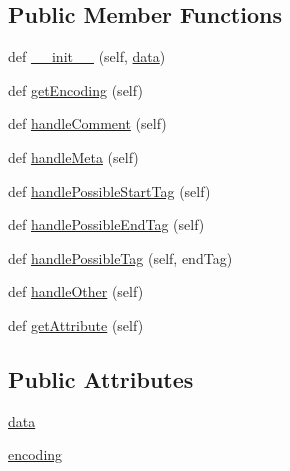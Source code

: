 \subsection*{Public Member Functions}
\begin{DoxyCompactItemize}
\item 
def \hyperlink{classpip_1_1__vendor_1_1html5lib_1_1__inputstream_1_1EncodingParser_a38fcb1ec08c164837e25406f5e9c3325}{\+\_\+\+\_\+init\+\_\+\+\_\+} (self, \hyperlink{classpip_1_1__vendor_1_1html5lib_1_1__inputstream_1_1EncodingParser_a52cea4969095a345e2bc788fb7c1aae9}{data})
\item 
def \hyperlink{classpip_1_1__vendor_1_1html5lib_1_1__inputstream_1_1EncodingParser_aab9a865ddddd92e25a662fe8e622ca64}{get\+Encoding} (self)
\item 
def \hyperlink{classpip_1_1__vendor_1_1html5lib_1_1__inputstream_1_1EncodingParser_a6f1228ec5dff80d48874429c01d867ea}{handle\+Comment} (self)
\item 
def \hyperlink{classpip_1_1__vendor_1_1html5lib_1_1__inputstream_1_1EncodingParser_ad53d84ecda3a740a1d01ea3a48053ef2}{handle\+Meta} (self)
\item 
def \hyperlink{classpip_1_1__vendor_1_1html5lib_1_1__inputstream_1_1EncodingParser_a98a2af65d4992b41c6c85c3151eacfd0}{handle\+Possible\+Start\+Tag} (self)
\item 
def \hyperlink{classpip_1_1__vendor_1_1html5lib_1_1__inputstream_1_1EncodingParser_ad120051994323380952bfe6b97a4c630}{handle\+Possible\+End\+Tag} (self)
\item 
def \hyperlink{classpip_1_1__vendor_1_1html5lib_1_1__inputstream_1_1EncodingParser_adb3885d27f6c8ee0a03c8393c46efed9}{handle\+Possible\+Tag} (self, end\+Tag)
\item 
def \hyperlink{classpip_1_1__vendor_1_1html5lib_1_1__inputstream_1_1EncodingParser_a4eec63b8ae792105a18d8c95b30dc2c0}{handle\+Other} (self)
\item 
def \hyperlink{classpip_1_1__vendor_1_1html5lib_1_1__inputstream_1_1EncodingParser_afafc3bf2f562e4ff60c57dbe4edc8689}{get\+Attribute} (self)
\end{DoxyCompactItemize}
\subsection*{Public Attributes}
\begin{DoxyCompactItemize}
\item 
\hyperlink{classpip_1_1__vendor_1_1html5lib_1_1__inputstream_1_1EncodingParser_a52cea4969095a345e2bc788fb7c1aae9}{data}
\item 
\hyperlink{classpip_1_1__vendor_1_1html5lib_1_1__inputstream_1_1EncodingParser_a0d54a7d72b84ea44e688f26b7af8eddd}{encoding}
\end{DoxyCompactItemize}


